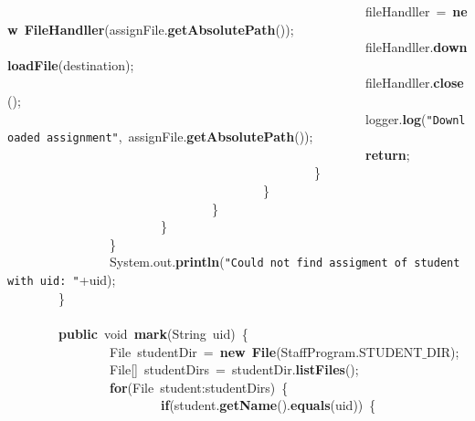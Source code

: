 \mbox{}\ \ \ \ \ \ \ \ \ \ \ \ \ \ \ \ \ \ \ \ \ \ \ \ \ \ \ \ \ \ \ \ \ \ \ \ \ \ \ \ \ \ \ \ \ \ \ \ \ \ \ \ \ \ \ \ fileHandller\ =\ \textbf{new}\ \textbf{FileHandller}(assignFile.\textbf{getAbsolutePath}()); \\
\mbox{}\ \ \ \ \ \ \ \ \ \ \ \ \ \ \ \ \ \ \ \ \ \ \ \ \ \ \ \ \ \ \ \ \ \ \ \ \ \ \ \ \ \ \ \ \ \ \ \ \ \ \ \ \ \ \ \ fileHandller.\textbf{downloadFile}(destination); \\
\mbox{}\ \ \ \ \ \ \ \ \ \ \ \ \ \ \ \ \ \ \ \ \ \ \ \ \ \ \ \ \ \ \ \ \ \ \ \ \ \ \ \ \ \ \ \ \ \ \ \ \ \ \ \ \ \ \ \ fileHandller.\textbf{close}(); \\
\mbox{}\ \ \ \ \ \ \ \ \ \ \ \ \ \ \ \ \ \ \ \ \ \ \ \ \ \ \ \ \ \ \ \ \ \ \ \ \ \ \ \ \ \ \ \ \ \ \ \ \ \ \ \ \ \ \ \ logger.\textbf{log}(\texttt{"{}Downloaded\ assignment"{}},\ assignFile.\textbf{getAbsolutePath}()); \\
\mbox{}\ \ \ \ \ \ \ \ \ \ \ \ \ \ \ \ \ \ \ \ \ \ \ \ \ \ \ \ \ \ \ \ \ \ \ \ \ \ \ \ \ \ \ \ \ \ \ \ \ \ \ \ \ \ \ \ \textbf{return}; \\
\mbox{}\ \ \ \ \ \ \ \ \ \ \ \ \ \ \ \ \ \ \ \ \ \ \ \ \ \ \ \ \ \ \ \ \ \ \ \ \ \ \ \ \ \ \ \ \ \ \ \ \} \\
\mbox{}\ \ \ \ \ \ \ \ \ \ \ \ \ \ \ \ \ \ \ \ \ \ \ \ \ \ \ \ \ \ \ \ \ \ \ \ \ \ \ \ \} \\
\mbox{}\ \ \ \ \ \ \ \ \ \ \ \ \ \ \ \ \ \ \ \ \ \ \ \ \ \ \ \ \ \ \ \ \} \\
\mbox{}\ \ \ \ \ \ \ \ \ \ \ \ \ \ \ \ \ \ \ \ \ \ \ \ \} \\
\mbox{}\ \ \ \ \ \ \ \ \ \ \ \ \ \ \ \ \} \\
\mbox{}\ \ \ \ \ \ \ \ \ \ \ \ \ \ \ \ System.out.\textbf{println}(\texttt{"{}Could\ not\ find\ assigment\ of\ student\ with\ uid:\ "{}}+uid); \\
\mbox{}\ \ \ \ \ \ \ \ \} \\
\mbox{} \\
\mbox{}\ \ \ \ \ \ \ \ \textbf{public}\ void\ \textbf{mark}(String\ uid)\ \{ \\
\mbox{}\ \ \ \ \ \ \ \ \ \ \ \ \ \ \ \ File\ studentDir\ =\ \textbf{new}\ \textbf{File}(StaffProgram.STUDENT$\_$DIR); \\
\mbox{}\ \ \ \ \ \ \ \ \ \ \ \ \ \ \ \ File[]\ studentDirs\ =\ studentDir.\textbf{listFiles}(); \\
\mbox{}\ \ \ \ \ \ \ \ \ \ \ \ \ \ \ \ \textbf{for}(File\ student:studentDirs)\ \{ \\
\mbox{}\ \ \ \ \ \ \ \ \ \ \ \ \ \ \ \ \ \ \ \ \ \ \ \ \textbf{if}(student.\textbf{getName}().\textbf{equals}(uid))\ \{ \\
